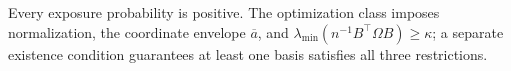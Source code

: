 Every exposure probability is positive.  The optimization class imposes normalization, the coordinate envelope \(\overline a\), and \(\lambda_{\min}(n^{-1}B^{\top}\Omega B)\ge\kappa\); a separate existence condition guarantees at least one basis satisfies all three restrictions.